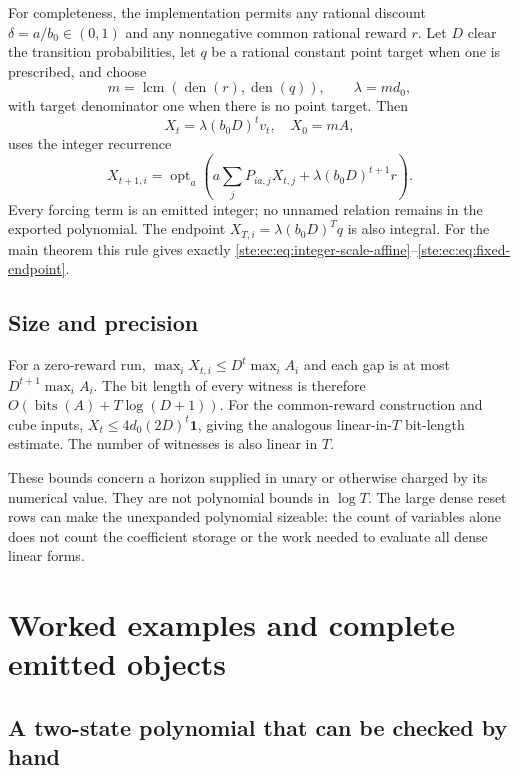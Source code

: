 \documentclass[11pt,letterpaper]{article}
\theoremstyle{definition}
\theoremstyle{remark}
\newcommand{\one}{\mathbf 1}
\newcommand{\opt}{\operatorname{opt}}
\newcommand{\bits}{\operatorname{bits}}
\newcommand{\lcm}{\operatorname{lcm}}
\begin{document}
For completeness, the implementation permits any rational discount
$\delta=a/b_0\in(0,1)$ and any nonnegative common rational reward $r$.
Let $D$ clear the transition probabilities, let $q$ be a rational constant
point target when one is prescribed, and choose
\[
 m=\lcm(\operatorname{den}(r),\operatorname{den}(q)),\qquad
 \lambda=md_0,
\]
with target denominator one when there is no point target. Then
\[
 X_t=\lambda(b_0D)^tv_t,\quad X_0=mA,
\]
uses the integer recurrence
\[
 X_{t+1,i}=\opt_a\left(a\sum_jP_{ia,j}X_{t,j}
                       +\lambda(b_0D)^{t+1}r\right).
\]
Every forcing term is an emitted integer; no unnamed relation remains in
the exported polynomial. The endpoint $X_{T,i}=\lambda(b_0D)^Tq$ is also
integral. For the main theorem this rule gives exactly
\eqref{ste:ec:eq:integer-scale-affine}--\eqref{ste:ec:eq:fixed-endpoint}.

\subsection{Size and precision}

For a zero-reward run, $\max_iX_{t,i}\leq D^t\max_iA_i$ and each gap is
at most $D^{t+1}\max_iA_i$. The bit length of every witness is therefore
$O(\bits(A)+T\log(D+1))$. For the common-reward construction and cube
inputs, $X_t\leq4d_0(2D)^t\one$, giving the analogous linear-in-$T$
bit-length estimate. The number of witnesses is also linear in $T$.

These bounds concern a horizon supplied in unary or otherwise charged by
its numerical value. They are not polynomial bounds in $\log T$.
The large dense reset rows can make the unexpanded polynomial sizeable:
the count of variables alone does not count the coefficient storage or
the work needed to evaluate all dense linear forms.

\section{Worked examples and complete emitted objects}
\label{ste:ec:sec:examples}

\subsection{A two-state polynomial that can be checked by hand}
\end{document}
